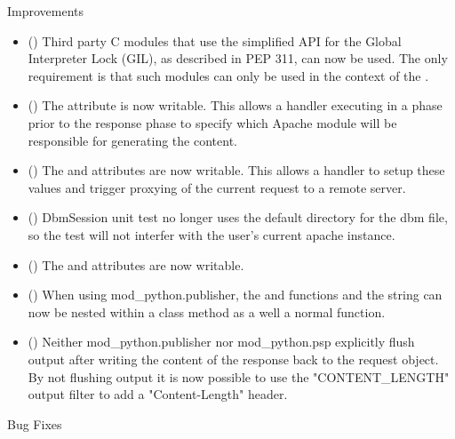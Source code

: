   Improvements

  \begin{itemize}
    \item
      ()
      Third party C modules that use the simplified API for the Global
      Interpreter Lock (GIL), as described in PEP 311, can now be used. The
      only requirement is that such modules can only be used in the context
      of the .
    \item
      ()
      The  attribute is now writable. This allows a handler
      executing in a phase prior to the response phase to specify which
      Apache module will be responsible for generating the content.
    \item
      ()
      The  and  attributes are now writable.
      This allows a handler to setup these values and trigger proxying of the
      current request to a remote server.
    \item
      ()
      DbmSession unit test no longer uses the default directory for the dbm file,
      so the test will not interfer with the user's current apache instance.
    \item
      ()
      The  and  attributes are
      now writable.
    \item
      ()
      When using mod_python.publisher, the  and
       functions and the  string
      can now be nested within a class method as a well a normal function.
    \item
      ()
      Neither mod_python.publisher nor mod_python.psp explicitly flush
      output after writing the content of the response back to the request
      object. By not flushing output it is now possible to use the
      "CONTENT_LENGTH" output filter to add a "Content-Length" header.
  \end{itemize}

  Bug Fixes


